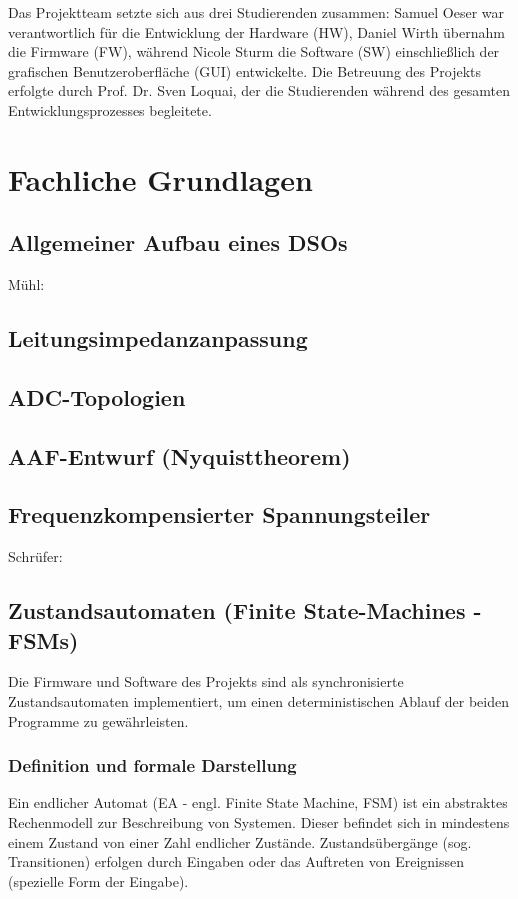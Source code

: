 \documentclass[a4paper, portrait, 12pt]{scrartcl} %
\begin{document}
Das Projektteam setzte sich aus drei Studierenden zusammen: Samuel Oeser war verantwortlich für die Entwicklung der Hardware (HW), Daniel Wirth übernahm die Firmware (FW), während Nicole Sturm die Software (SW) einschließlich der grafischen Benutzeroberfläche (GUI) entwickelte. Die Betreuung des Projekts erfolgte durch Prof. Dr. Sven Loquai, der die Studierenden während des gesamten Entwicklungsprozesses begleitete.
\pagebreak

\section{Fachliche Grundlagen}

\subsection{Allgemeiner Aufbau eines DSOs}
\label{subsec:oscilloscope_func}
Mühl: \cite[Abb. 14.1]{Muehl2020}

\subsection{Leitungsimpedanzanpassung}

\subsection{ADC-Topologien}

\subsection{AAF-Entwurf (Nyquisttheorem)}
\label{subsec:aaf_nyquist}

\subsection{Frequenzkompensierter Spannungsteiler}
Schrüfer: \cite[S. 114ff]{Schruefer2022}
\pagebreak

\subsection{Zustandsautomaten (Finite State-Machines - FSMs)}
Die Firmware und Software des Projekts sind als synchronisierte Zustandsautomaten implementiert, um einen deterministischen Ablauf der beiden Programme zu gewährleisten.
\subsubsection{Definition und formale Darstellung}
Ein endlicher Automat (EA - engl. Finite State Machine, FSM) ist ein abstraktes Rechenmodell zur Beschreibung von Systemen. Dieser befindet sich in mindestens einem Zustand von einer Zahl endlicher Zustände. Zustandsübergänge (sog. Transitionen) erfolgen durch Eingaben oder das Auftreten von Ereignissen (spezielle Form der Eingabe).\\
\end{document}

